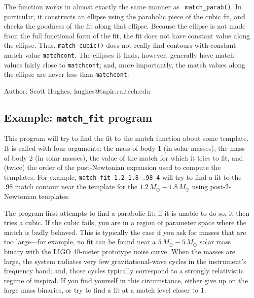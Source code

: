The function works in almost exactly the same manner as {\tt
match\_parab()}.  In particular, it constructs an ellipse using
the parabolic piece of the cubic fit, and checks the goodness
of the fit along that ellipse.  Because the ellipse is not made
from the full functional form of the fit, the fit does not have
constant value along the ellipse.  Thus, {\tt match\_cubic()}
does not really find contours with constant match value
{\tt matchcont}.  The ellipses it finds, however, generally
have match values fairly close to {\tt matchcont}; and, more
importantly, the match values along the ellipse are never less
than {\tt matchcont}.

\begin{description}
\item{Author:} Scott Hughes, hughes@tapir.caltech.edu
\end{description}

\clearpage
\subsection{Example: {\tt match\_fit} program}
\label{ss:match_fit}

This program will try to find the fit to the match function
about some template.  It is called with four arguments: the
mass of body 1 (in solar masses), the mass of body 2 (in
solar masses), the value of the match for which it tries
to fit, and (twice) the order of the post-Newtonian expansion
used to compute the templates.  For example,
{\tt match\_fit 1.2 1.8 .98 4} will try to find a fit to
the .98 match contour near the template for the
$1.2\,M_\odot-1.8\,M_\odot$ using post-2-Newtonian templates.

The program first attempts to find a parabolic fit; if it
is unable to do so, it then tries a cubic.  If the cubic
fails, you are in a region of parameter space where the match
is badly behaved.  This is typically the case if you ask for
masses that are too large---for example, no fit can be found
near a $5\,M_\odot-5\,M_\odot$ solar mass binary with the
LIGO 40-meter prototype noise curve.  When the masses are large,
the system radiates very few gravitational-wave cycles in the
instrument's frequency band; and, those cycles typically correspond
to a strongly relativistic regime of inspiral.  If you find
yourself in this circumstance, either give up on the large
mass binaries, or try to find a fit at a match level closer to
1.


